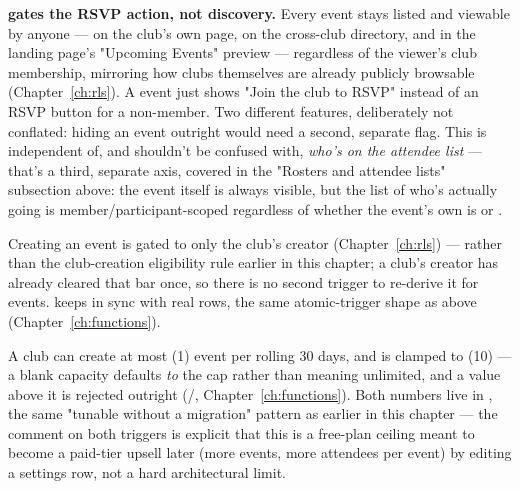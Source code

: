 \begin{olknote}
\textbf{ gates the RSVP action, not discovery.} Every event stays listed and viewable by anyone — on the club's own page, on the cross-club  directory, and in the landing page's "Upcoming Events" preview — regardless of the viewer's club membership, mirroring how clubs themselves are already publicly browsable (Chapter~\ref{ch:rls}). A  event just shows "Join the club to RSVP" instead of an RSVP button for a non-member. Two different features, deliberately not conflated: hiding an event outright would need a second, separate flag. This is independent of, and shouldn't be confused with, \emph{who's on the attendee list} — that's a third, separate axis, covered in the "Rosters and attendee lists" subsection above: the event itself is always visible, but the list of who's actually going is member/participant-scoped regardless of whether the event's own  is  or .
\end{olknote}

Creating an event is gated to only the club's creator (Chapter~\ref{ch:rls}) — rather than the club-creation eligibility rule earlier in this chapter; a club's creator has already cleared that bar once, so there is no second trigger to re-derive it for events.  keeps  in sync with real  rows, the same atomic-trigger shape as  above (Chapter~\ref{ch:functions}).

\begin{olknote}
A club can create at most  (1) event per rolling 30 days, and  is clamped to  (10) — a blank capacity defaults \emph{to} the cap rather than meaning unlimited, and a value above it is rejected outright (/, Chapter~\ref{ch:functions}). Both numbers live in , the same "tunable without a migration" pattern as  earlier in this chapter — the comment on both triggers is explicit that this is a free-plan ceiling meant to become a paid-tier upsell later (more events, more attendees per event) by editing a settings row, not a hard architectural limit.
\end{olknote}

